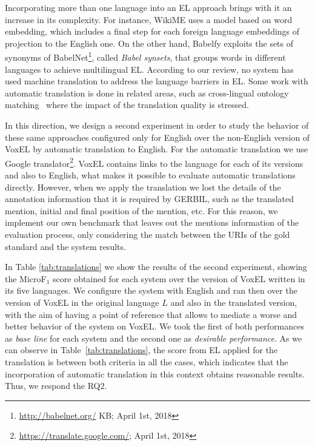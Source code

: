 \documentclass{llncs}
\begin{document}
Incorporating more than one language into an EL approach brings with it an increase in its complexity. For instance, WikiME uses a model based on word embedding, which includes a final step for each foreign language embeddings of projection to the English one. On the other hand, Babelfy exploits the sets of synonyms of BabelNet\footnote{\url{http://babelnet.org/} KB; April 1st, 2018}, called \textit{Babel synsets}, that groups words in different languages to achieve multilingual EL. According to our review, no system has used machine translation to address the language barriers in EL. Some work with automatic translation is done in related areas, such as cross-lingual ontology matching~\cite{fu2010} where the impact of the translation quality is stressed.

In this direction, we design a second experiment in order to study the behavior of these same approaches configured only for English over the non-English version of VoxEL by automatic translation to English. For the automatic translation we use Google translator\footnote{\url{https://translate.google.com/}; April 1st, 2018}. VoxEL contains links to the language for each of its versions and also to English, what makes it possible to evaluate automatic translations directly. However, when we apply the translation we lost the details of the annotation information that it is required by GERBIL, such as the translated mention, initial and final position of the mention, etc. For this reason, we implement our own benchmark that leaves out the mentions information of the evaluation process, only considering the match between the URIs of the gold standard and the system results. 

In Table \ref{tab:translations} we show the results of the second experiment, showing the MicroF$_1$ score obtained for each system over the version of VoxEL written in its five languages. We configure the system with English and ran then over the version of VoxEL in the original language $L$ and also in the translated version, with the aim of having a point of reference that allows to mediate a worse and better behavior of the system on VoxEL. We took the first of both performances as \textit{base line} for each system and the second one as \textit{desirable performance}. As we can observe in Table~\ref{tab:translations}, the score from EL applied for the translation is between both criteria in all the cases, which indicates that the incorporation of automatic translation in this context obtains reasonable results. Thus, we respond the RQ2.
\end{document}
